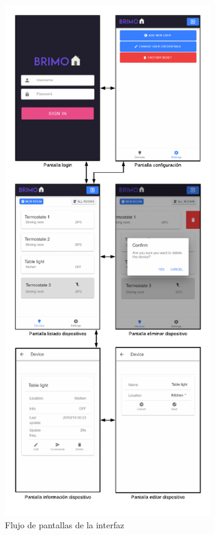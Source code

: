 \begin{figure}[H]
\centering
\includegraphics[width=3.50in]{images/flujo_pantallas.png}
\caption{Flujo de pantallas de la interfaz}
\label{fig:flujo_pantallas}
\end{figure}

